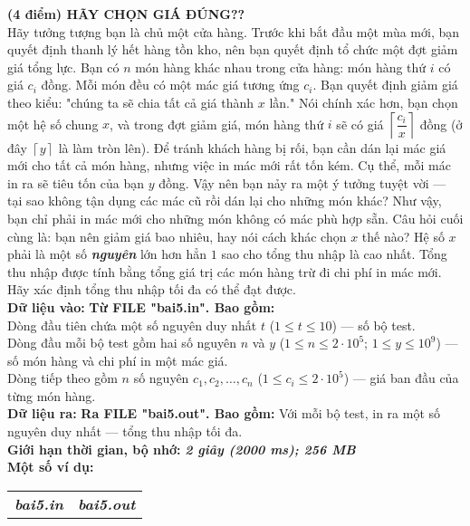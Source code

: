 \begin{ex}
	\textbf{(4 điểm) HÃY CHỌN GIÁ ĐÚNG??}\\
	Hãy tưởng tượng bạn là chủ một cửa hàng. Trước khi bắt đầu một mùa mới, bạn quyết định thanh lý hết hàng tồn kho, nên bạn quyết định tổ chức một đợt giảm giá tổng lực. Bạn có $n$ món hàng khác nhau trong cửa hàng: món hàng thứ $i$ có giá $c_i$ đồng. Mỗi món đều có một mác giá tương ứng $c_i$. Bạn quyết định giảm giá theo kiểu: "chúng ta sẽ chia tất cả giá thành $x$ lần." Nói chính xác hơn, bạn chọn một hệ số chung $x$, và trong đợt giảm giá, món hàng thứ $i$ sẽ có giá $\left\lceil \dfrac{c_i}{x} \right\rceil$ đồng (ở đây $\left\lceil y \right\rceil$ là làm tròn lên). Để tránh khách hàng bị rối, bạn cần dán lại mác giá mới cho tất cả món hàng, nhưng việc in mác mới rất tốn kém. Cụ thể, mỗi mác in ra sẽ tiêu tốn của bạn $y$ đồng. Vậy nên bạn nảy ra một ý tưởng tuyệt vời — tại sao không tận dụng các mác cũ rồi dán lại cho những món khác? Như vậy, bạn chỉ phải in mác mới cho những món không có mác phù hợp sẵn. Câu hỏi cuối cùng là: bạn nên giảm giá bao nhiêu, hay nói cách khác chọn $x$ thế nào? Hệ số $x$ phải là một số \textit{\textbf{nguyên}} lớn hơn hẳn $1$ sao cho tổng thu nhập là cao nhất. Tổng thu nhập được tính bằng tổng giá trị các món hàng trừ đi chi phí in mác mới. Hãy xác định tổng thu nhập tối đa có thể đạt được.\\
	\textbf{Dữ liệu vào: } \textbf{Từ FILE "bai5.in". Bao gồm: }\\
	Dòng đầu tiên chứa một số nguyên duy nhất $t$ ($1 \le t \le 10$) — số bộ test. \\
	Dòng đầu mỗi bộ test gồm hai số nguyên $n$ và $y$ ($1 \le n \le 2 \cdot 10^5$; $1 \le y \le 10^9$) — số món hàng và chi phí in một mác giá. \\
	Dòng tiếp theo gồm $n$ số nguyên $c_1, c_2, \dots, c_n$ ($1 \le c_i \le 2 \cdot 10^5$) — giá ban đầu của từng món hàng.\\
	\textbf{Dữ liệu ra: } \textbf{Ra FILE "bai5.out". Bao gồm: }Với mỗi bộ test, in ra một số nguyên duy nhất — tổng thu nhập tối đa.\\
	\textbf{Giới hạn thời gian, bộ nhớ: } \textbf{\textit{2 giây (2000 ms); 256 MB}} \\
	\textbf{Một số ví dụ: }
	\begin{center}
		\begin{tabular}{|l|l|}
			\hline
			\textbf{\textsf{\textit{bai5.in}}}                & \textbf{\textsf{\textit{bai5.out}}} \\ %

\end{tabular}
\end{center}
\end{ex}
